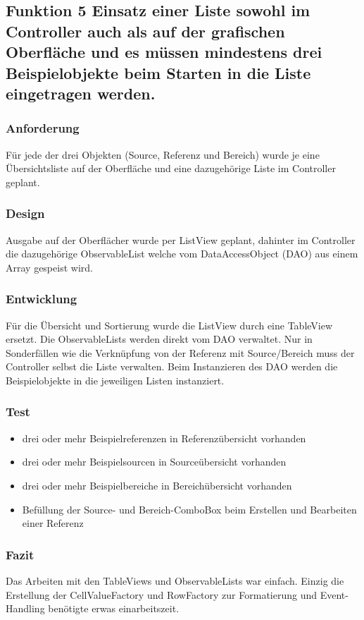 \subsection[Funktion 5 Listeneinsatz mit Beispielobjekten]{Funktion 5 Einsatz einer Liste sowohl im Controller auch als auf der grafischen Oberfläche und es müssen mindestens drei Beispielobjekte beim Starten in die Liste eingetragen werden.}

\subsubsection{Anforderung}
Für jede der drei Objekten (Source, Referenz und Bereich) wurde je eine Übersichtsliste auf der Oberfläche und eine dazugehörige Liste im Controller geplant.

\subsubsection{Design}
Ausgabe auf der Oberflächer wurde per ListView geplant, dahinter im Controller die dazugehörige ObservableList welche vom DataAccessObject (DAO) aus einem Array gespeist wird.

\subsubsection{Entwicklung}
Für die Übersicht und Sortierung wurde die ListView durch eine TableView ersetzt. Die ObservableLists werden direkt vom DAO verwaltet. Nur in Sonderfällen wie die Verknüpfung von der Referenz mit Source/Bereich muss der Controller selbst die Liste verwalten. Beim Instanzieren des DAO werden die Beispielobjekte in die jeweiligen Listen instanziert.

\subsubsection{Test}
\begin{itemize}
	\item drei oder mehr Beispielreferenzen in Referenzübersicht vorhanden
	\item drei oder mehr Beispielsourcen in Sourceübersicht vorhanden
	\item drei oder mehr Beispielbereiche in Bereichübersicht vorhanden
	\item Befüllung der Source- und Bereich-ComboBox beim Erstellen und Bearbeiten einer Referenz
\end{itemize}

\subsubsection{Fazit}
Das Arbeiten mit den TableViews und ObservableLists war einfach. Einzig die Erstellung der CellValueFactory und RowFactory zur Formatierung und Event-Handling benötigte erwas einarbeitszeit.
